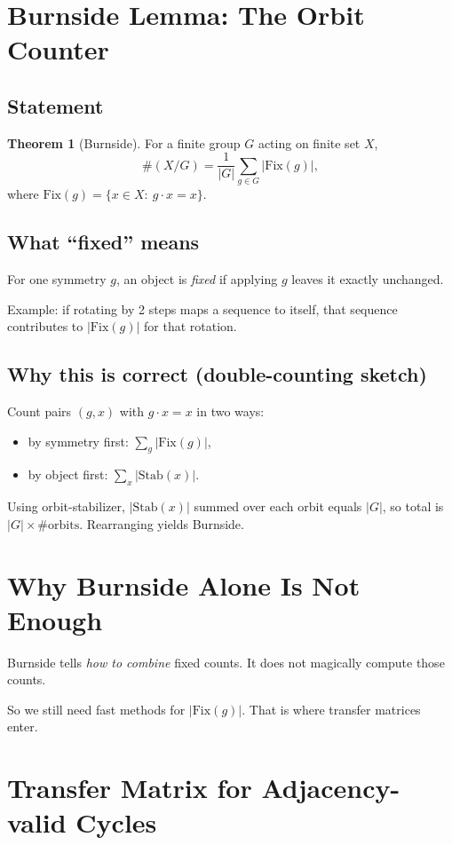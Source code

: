 \documentclass[12pt]{article}
\theoremstyle{definition}
\newtheorem{theorem}[definition]{Theorem}
\begin{document}
\section{Burnside Lemma: The Orbit Counter}
\subsection{Statement}
\begin{theorem}[Burnside]
For a finite group \(G\) acting on finite set \(X\),
\[
\#(X/G)=\frac{1}{|G|}\sum_{g\in G}|\mathrm{Fix}(g)|,
\]
where \(\mathrm{Fix}(g)=\{x\in X:\ g\cdot x=x\}\).
\end{theorem}

\subsection{What ``fixed'' means}
For one symmetry \(g\), an object is \emph{fixed} if applying \(g\) leaves it exactly unchanged.

Example: if rotating by 2 steps maps a sequence to itself, that sequence contributes to \(|\mathrm{Fix}(g)|\) for that rotation.

\subsection{Why this is correct (double-counting sketch)}
Count pairs \((g,x)\) with \(g\cdot x=x\) in two ways:
\begin{itemize}
    \item by symmetry first: \(\sum_g |\mathrm{Fix}(g)|\),
    \item by object first: \(\sum_x |\mathrm{Stab}(x)|\).
\end{itemize}
Using orbit-stabilizer, \(|\mathrm{Stab}(x)|\) summed over each orbit equals \(|G|\), so total is \(|G|\times\#\text{orbits}\). Rearranging yields Burnside.

\section{Why Burnside Alone Is Not Enough}
Burnside tells \emph{how to combine} fixed counts. It does not magically compute those counts.

So we still need fast methods for \(|\mathrm{Fix}(g)|\). That is where transfer matrices enter.

\section{Transfer Matrix for Adjacency-valid Cycles}
\end{document}
